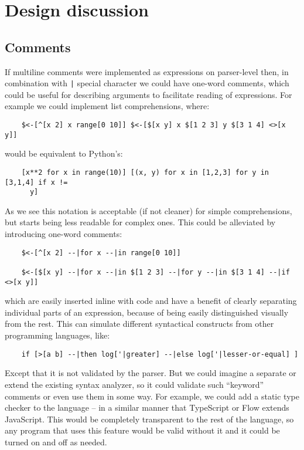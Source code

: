 \chapter{Design discussion}\label{chap:design}

\section{Comments}\label{sec:comments}
If multiline comments were implemented as expressions on parser-level then, in
combination with \texttt{|} special character we could have one-word comments,
which could be useful for describing arguments to facilitate reading of
expressions. For example we could implement list comprehensions, where:
\begin{lstlisting}
    $<-[^[x 2] x range[0 10]] $<-[$[x y] x $[1 2 3] y $[3 1 4] <>[x y]]
\end{lstlisting}
would be equivalent to
Python's\cite[Section~5.1.3]{python_tutorial}:
\begin{lstlisting}
    [x**2 for x in range(10)] [(x, y) for x in [1,2,3] for y in [3,1,4] if x !=
      y]
\end{lstlisting}
As we see this notation is acceptable (if not cleaner) for simple
comprehensions, but starts being less readable for complex ones. This could be
alleviated by introducing one-word comments:
\begin{lstlisting}
    $<-[^[x 2] --|for x --|in range[0 10]]
    
    $<-[$[x y] --|for x --|in $[1 2 3] --|for y --|in $[3 1 4] --|if <>[x y]]
\end{lstlisting}
which are easily inserted inline with code and have a benefit of clearly
separating individual parts of an expression, because of being easily
distinguished visually from the rest. This can simulate different syntactical
constructs from other programming languages, like:
\begin{lstlisting}
    if [>[a b] --|then log['|greater] --|else log['|lesser-or-equal] ]
\end{lstlisting}
Except that it is not validated by the parser. But we could imagine a separate
or extend the existing syntax analyzer, so it could validate such ``keyword''
comments or even use them in some way. For example, we could add a static type
checker to the language -- in a similar manner that TypeScript or
Flow\cite{flow_site} extends JavaScript. This would be
completely transparent to the rest of the language, so any program that uses
this feature would be valid without it and it could be turned on and off as
needed.

